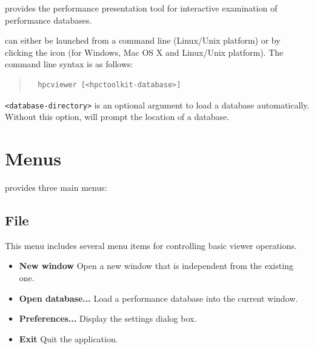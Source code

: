 

\HPCToolkit{} provides the \hpcviewer{} performance presentation tool for interactive examination of performance databases.

\hpcviewer{} can either be launched from a command line (Linux/Unix platform) or by clicking the \hpcviewer{} icon (for Windows, Mac OS X and Linux/Unix platform).
The command line syntax is as follows:
\begin{quote}
\begin{verbatim}
  hpcviewer [<hpctoolkit-database>]
\end{verbatim}
\end{quote}
\texttt{<database-directory>} is an optional argument to load a database automatically.
Without this option, \hpcviewer{} will prompt the location of a database.



\section{Menus}

\hpcviewer{} provides three main menus:


\subsection{File}
This menu includes several menu items for controlling basic viewer operations.
\begin{itemize}
\item \textbf{New window}
  Open a new \hpcviewer{} window that is independent from the existing one.

\item \textbf{Open database...}
  Load a performance database into the current \hpcviewer{} window.

\item \textbf{Preferences...}
  Display the settings dialog box.

\item \textbf{Exit}
  Quit the \hpcviewer{} application.

\end{itemize}

